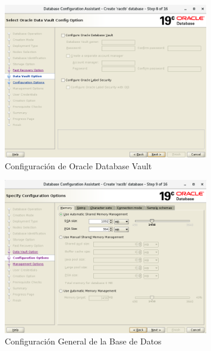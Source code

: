\documentclass{article}
\begin{document}
\begin{figure}[H]
		\begin{center}
			\includegraphics[width=0.80\textwidth]{db_creation_9_data_vaut_options.png}
		\end{center}
		\caption{Configuración de Oracle Database Vault}
\end{figure}


\begin{figure}[H]
		\begin{center}
			\includegraphics[width=0.80\textwidth]{db_creation_10_configuration_options.png}
		\end{center}
		\caption{Configuración General de la Base de Datos}
\end{figure}
\end{document}
